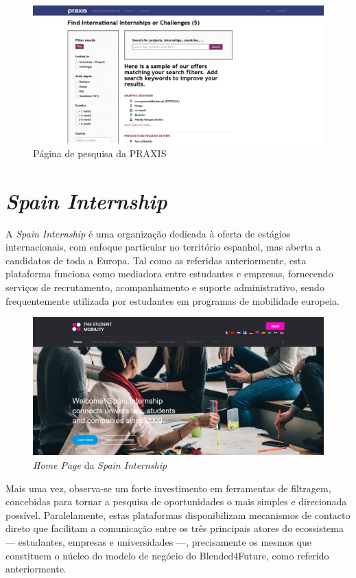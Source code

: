 \begin{figure}[h!tbp]
    \centering
    \includegraphics[width=0.9\linewidth]{capitulos/cap2-estadodaarte/assets/image/praxis/praxis-search.png}
    \caption{Página de pesquisa da PRAXIS}
\end{figure}

\section{\textit{Spain Internship}}

A \textit{Spain Internship} é uma organização dedicada à oferta de estágios internacionais, com enfoque particular no território espanhol, mas aberta a candidatos de toda a Europa. Tal como as referidas anteriormente, esta plataforma funciona como mediadora entre estudantes e empresas, fornecendo serviços de recrutamento, acompanhamento e suporte administrativo, sendo frequentemente utilizada por estudantes em programas de mobilidade europeia.

\begin{figure}[h!tbp]
    \centering
    \includegraphics[width=0.9\linewidth]{capitulos/cap2-estadodaarte/assets/image/spain-internship/spain-internship-homepage.png}
    \caption{\textit{Home Page} da \textit{Spain Internship}}
    \label{fig:spain-homepage}
\end{figure}

Mais uma vez, observa-se um forte investimento em ferramentas de filtragem, concebidas para tornar a pesquisa de oportunidades o mais simples e direcionada possível. Paralelamente, estas plataformas disponibilizam mecanismos de contacto direto que facilitam a comunicação entre os três principais atores do ecossistema — estudantes, empresas e universidades —, precisamente os mesmos que constituem o núcleo do modelo de negócio do Blended4Future, como referido anteriormente.

